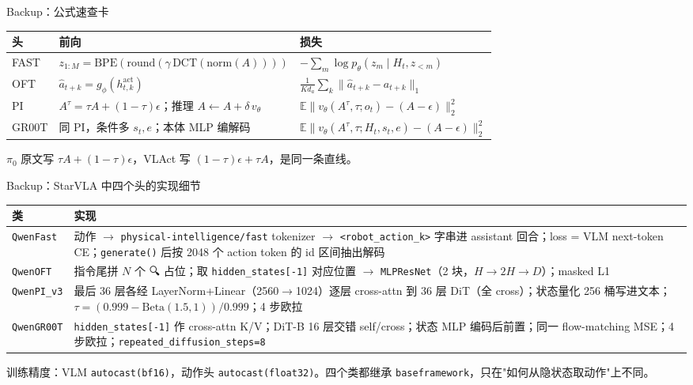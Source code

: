 \documentclass[aspectratio=169,10pt]{beamer}
\begin{document}
\begin{frame}{Backup：公式速查卡}
  \begin{center}\small
  \begin{tabular}{p{1.3cm}p{6.2cm}p{5.2cm}}
    \toprule
    头 & 前向 & 损失 \\
    \midrule
    FAST & $z_{1:M}=\mathrm{BPE}(\mathrm{round}(\gamma\,\mathrm{DCT}(\mathrm{norm}(A))))$ & $-\sum_m\log p_\theta(z_m\mid H_t,z_{<m})$ \\
    OFT & $\hat a_{t+k}=g_\phi(h^{\text{act}}_{t,k})$ & $\frac{1}{Kd_a}\sum_k\|\hat a_{t+k}-a_{t+k}\|_1$ \\
    PI & $A^\tau=\tau A+(1-\tau)\epsilon$；推理 $A\leftarrow A+\delta\,v_\theta$ & $\mathbb{E}\|v_\theta(A^\tau,\tau;o_t)-(A-\epsilon)\|_2^2$ \\
    GR00T & 同 PI，条件多 $s_t,e$；本体 MLP 编解码 & $\mathbb{E}\|v_\theta(A^\tau,\tau;H_t,s_t,e)-(A-\epsilon)\|_2^2$ \\
    \bottomrule
  \end{tabular}
  \end{center}
  \vspace{6pt}
  $\pi_0$ 原文写 $\tau A+(1-\tau)\epsilon$，VLAct 写 $(1-\tau)\epsilon+\tau A$，是同一条直线。
\end{frame}

\begin{frame}{Backup：StarVLA 中四个头的实现细节}
  \begin{center}\footnotesize
  \begin{tabular}{p{1.6cm}p{11.2cm}}
    \toprule
    类 & 实现 \\
    \midrule
    \texttt{QwenFast} & 动作 $\to$ \texttt{physical-intelligence/fast} tokenizer $\to$ \texttt{<robot\_action\_k>} 字串进 assistant 回合；loss = VLM next-token CE；\texttt{generate()} 后按 2048 个 action token 的 id 区间抽出解码 \\
    \texttt{QwenOFT} & 指令尾拼 $N$ 个 🔍 占位；取 \texttt{hidden\_states[-1]} 对应位置 $\to$ \texttt{MLPResNet}（2 块，$H\to2H\to D$）；masked L1 \\
    \texttt{QwenPI\_v3} & 最后 36 层各经 LayerNorm+Linear（2560$\to$1024）逐层 cross-attn 到 36 层 DiT（全 cross）；状态量化 256 桶写进文本；$\tau=(0.999-\mathrm{Beta}(1.5,1))/0.999$；4 步欧拉 \\
    \texttt{QwenGR00T} & \texttt{hidden\_states[-1]} 作 cross-attn K/V；DiT-B 16 层交错 self/cross；状态 MLP 编码后前置；同一 flow-matching MSE；4 步欧拉；\texttt{repeated\_diffusion\_steps=8} \\
    \bottomrule
  \end{tabular}
  \end{center}
  \vspace{4pt}
  训练精度：VLM \texttt{autocast(bf16)}，动作头 \texttt{autocast(float32)}。四个类都继承 \texttt{baseframework}，只在"如何从隐状态取动作"上不同。
\end{frame}
\end{document}
